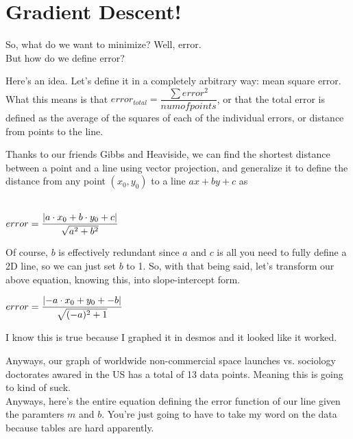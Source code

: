 \documentclass[a4paper]{article}
\begin{document}
\section*{Gradient Descent!}

So, what do we want to minimize? Well, error.\\

But how do we define error?

Here's an idea. Let's define it in a completely arbitrary way: mean square error.
What this means is that $error_{total} = \dfrac{\sum{error^2}}{numofpoints}$, or that the total error is defined as the average of the squares of each of the individual errors, or distance from points to the line.

\DeclarePairedDelimiter\abs{\lvert}{\rvert}%
\DeclarePairedDelimiter\norm{\lVert}{\rVert}%

Thanks to our friends Gibbs and Heaviside, we can find the shortest distance between a point and a line using vector projection, and generalize it to define the distance from any point $(x_0, y_0)$ to a line $ax + by + c$ as\\\\
\vspace{-22pt}
\begin{center}
    $error = \dfrac{\abs{a\cdot x_0 + b\cdot y_0 + c}}{\sqrt{a^2 + b^2}}$
\end{center}

Of course, $b$ is effectively redundant since $a$ and $c$ is all you need to fully define a 2D line, so we can just set $b$ to 1.
So, with that being said, let's transform our above equation, knowing this, into slope-intercept form.

\begin{center}
    $error = \dfrac{\abs{-a\cdot x_0 + y_0 + -b}}{\sqrt{(-a)^2 + 1}}$
\end{center}

I know this is true because I graphed it in desmos and it looked like it worked.


Anyways, our graph of worldwide non-commercial space launches vs. sociology doctorates awared in the US has a total of 13 data points. Meaning this is going to kind of suck.\\

Anyways, here's the entire equation defining the error function of our line given the paramters $m$ and $b$. You're just going to have to take my word on the data because tables are hard apparently.\\
\end{document}
